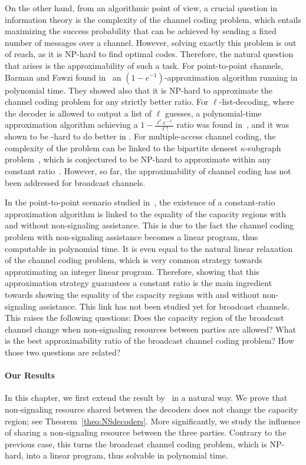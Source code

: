 On the other hand, from an algorithmic point of view, a crucial question in information theory is the complexity of the channel coding problem, which entails maximizing the success probability that can be achieved by sending a fixed number of messages over a channel. However, solving exactly this problem is out of reach, as it is \textrm{NP}-hard to find optimal codes. Therefore, the natural question that arises is the approximability of such a task. For point-to-point channels, Barman and Fawzi found in~\cite{BF18} an $(1-e^{-1})$-approximation algorithm running in polynomial time. They showed also that it is \textrm{NP}-hard to approximate the channel coding problem for any strictly better ratio. For $\ell$-list-decoding, where the decoder is allowed to output a list of $\ell$ guesses, a polynomial-time approximation algorithm achieving a $1-\frac{\ell^{\ell}e^{-\ell}}{\ell!}$ ratio was found in~\cite{BFGG20}, and it was shown to be -hard to do better in \cite{DMMS20}. For multiple-access channel coding, the complexity of the problem can be linked to the bipartite densest $\kappa$-subgraph problem~\cite{FKP01}, which is conjectured to be \textrm{NP}-hard to approximate within any constant ratio~\cite{AAMMW11}. However, so far, the approximability of channel coding has not been addressed for broadcast channels.

In the point-to-point scenario studied in~\cite{BF18}, the existence of a constant-ratio approximation algorithm is linked to the equality of the capacity regions with and without non-signaling assistance. This is due to the fact the channel coding problem with non-signaling assistance becomes a linear program, thus computable in polynomial time. It is even equal to the natural linear relaxation of the channel coding problem, which is very common strategy towards approximating an integer linear program. Therefore, showing that this approximation strategy guarantees a constant ratio is the main ingredient towards showing the equality of the capacity regions with and without non-signaling assistance. This link has not been studied yet for broadcast channels. This raises the following questions: Does the capacity region of the broadcast channel change when non-signaling resources between parties are allowed? What is the best approximability ratio of the broadcast channel coding problem? How those two questions are related?


\paragraph{Our Results} In this chapter, we first extend the result by~\cite{PDB21} in a natural way. We prove that non-signaling resource shared between the decoders does not change the capacity region; see Theorem~\ref{theo:NSdecoders}. More significantly, we study the influence of sharing a non-signaling resource between the three parties. Contrary to the previous case, this turns the broadcast channel coding problem, which is \textrm{NP}-hard, into a linear program, thus solvable in polynomial time.

